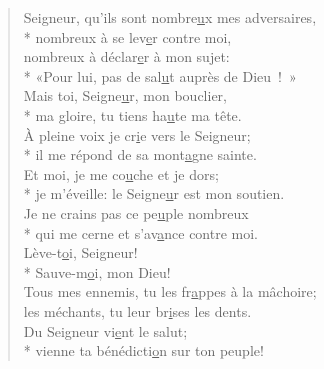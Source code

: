 
\begin{verse}
Seigneur, qu’ils sont nombre\underline{u}x mes adversaires, \\*
nombreux à se lev\underline{e}r contre moi, \\
nombreux à déclar\underline{e}r à mon sujet: \\*
«Pour lui, pas de sal\underline{u}t auprès de Dieu ! » \\

Mais toi, Seigne\underline{u}r, mon bouclier, \\*
ma gloire, tu tiens ha\underline{u}te ma tête. \\
À pleine voix je cr\underline{i}e vers le Seigneur; \\*
il me répond de sa mont\underline{a}gne sainte. \\

Et moi, je me co\underline{u}che et je dors; \\*
je m’éveille: le Seigne\underline{u}r est mon soutien. \\
Je ne crains pas ce pe\underline{u}ple nombreux \\*
qui me cerne et s’av\underline{a}nce contre moi. \\

Lève-t\underline{o}i, Seigneur! \\*
Sauve-m\underline{o}i, mon Dieu! \\
Tous mes ennemis, tu les fr\underline{a}ppes à la mâchoire; \\
les méchants, tu leur br\underline{i}ses les dents. \\

Du Seigneur vi\underline{e}nt le salut; \\*
vienne ta bénédicti\underline{o}n sur ton peuple! \\
\end{verse}


